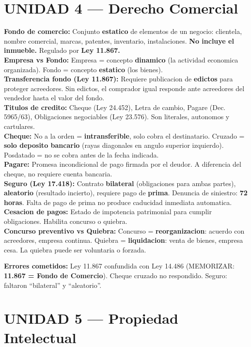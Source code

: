 \documentclass[10pt, a4paper]{article}
\newcommand{\D}[2]{\textbf{\color{azul}#1:} #2\\[1pt]}
\newcommand{\mal}[1]{\textbf{\color{rojo}#1}}
\newcommand{\alerta}[1]{\textbf{\color{naranja}#1}}
\begin{document}
\section*{UNIDAD 4 --- Derecho Comercial}

\begin{cajaClave}
\D{Fondo de comercio}{Conjunto \textbf{estatico} de elementos de un negocio: clientela, nombre comercial, marcas, patentes, inventario, instalaciones. \textbf{No incluye el inmueble.} Regulado por \alerta{Ley 11.867.}}
\D{Empresa vs Fondo}{Empresa = concepto \textbf{dinamico} (la actividad economica organizada). Fondo = concepto \textbf{estatico} (los bienes).}
\D{Transferencia fondo (Ley 11.867)}{Requiere publicacion de \textbf{edictos} para proteger acreedores. Sin edictos, el comprador igual responde ante acreedores del vendedor hasta el valor del fondo.}
\D{Titulos de credito}{Cheque (Ley 24.452), Letra de cambio, Pagare (Dec. 5965/63), Obligaciones negociables (Ley 23.576). Son literales, autonomos y cartulares.}
\D{Cheque}{No a la orden = \textbf{intransferible}, solo cobra el destinatario. Cruzado = \textbf{solo deposito bancario} (rayas diagonales en angulo superior izquierdo). Posdatado = no se cobra antes de la fecha indicada.}
\D{Pagare}{Promesa incondicional de pago firmada por el deudor. A diferencia del cheque, no requiere cuenta bancaria.}
\D{Seguro (Ley 17.418)}{Contrato \textbf{bilateral} (obligaciones para ambas partes), \textbf{aleatorio} (resultado incierto), requiere pago de \textbf{prima}. Denuncia de siniestro: \textbf{72 horas}. Falta de pago de prima no produce caducidad inmediata automatica.}
\D{Cesacion de pagos}{Estado de impotencia patrimonial para cumplir obligaciones. Habilita concurso o quiebra.}
\D{Concurso preventivo vs Quiebra}{Concurso = \textbf{reorganizacion}: acuerdo con acreedores, empresa continua. Quiebra = \textbf{liquidacion}: venta de bienes, empresa cesa. La quiebra puede ser voluntaria o forzada.}
\end{cajaClave}

\begin{cajaError}
\mal{Errores cometidos:} Ley 11.867 confundida con Ley 14.486 (MEMORIZAR: \textbf{11.867 = Fondo de Comercio}). Cheque cruzado no respondido. Seguro: faltaron ``bilateral'' y ``aleatorio''.
\end{cajaError}

\section*{UNIDAD 5 --- Propiedad Intelectual}
\end{document}
